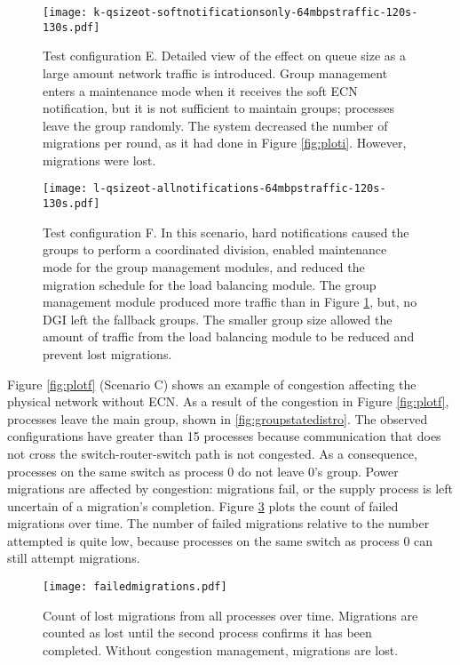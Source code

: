 \begin{figure}
\centering
\texttt{[image: k-qsizeot-softnotificationsonly-64mbpstraffic-120s-130s.pdf]}
\caption[Detailed view of the effect on queue size as a large amount network traffic is introduced.]{
    Test configuration E.
Detailed view of the effect on queue size as a large amount network traffic is introduced.
Group management enters a maintenance mode when it receives the soft \ac{ECN} notification, but it is not sufficient to maintain groups; processes leave the group randomly.
The system decreased the number of migrations per round, as it had done in Figure \ref{fig:ploti}.
However, migrations were lost.
}
\label{fig:plotk}
\centering
\end{figure}



\begin{figure}
\centering
\texttt{[image: l-qsizeot-allnotifications-64mbpstraffic-120s-130s.pdf]}
\caption[Effect on queue size as a large amount of network traffic is introduced.]
{
    Test configuration F.
In this scenario, hard notifications caused the groups to perform a coordinated division, enabled maintenance mode for the group management modules, and reduced the migration schedule for the load balancing module.
The group management module produced more traffic than in Figure \ref{fig:plotk}, but, no DGI left the fallback groups.
The smaller group size allowed the amount of traffic from the load balancing module to be reduced and prevent lost migrations.
}
\label{fig:plotl}
\end{figure}


Figure \ref{fig:plotf} (Scenario C) shows an example of congestion affecting the physical network without \ac{ECN}.
As a result of the congestion in Figure \ref{fig:plotf}, processes leave the main group, shown in \ref{fig:groupstatedistro}.
The observed configurations have greater than 15 processes because communication that does not cross the switch-router-switch path is not congested.
As a consequence, processes on the same switch as process 0 do not leave 0's group.
Power migrations are affected by congestion: migrations fail, or the supply process is left uncertain of a migration's completion.
Figure \ref{fig:plotg} plots the count of failed migrations over time.
The number of failed migrations relative to the number attempted is quite low, because processes on the same switch as process 0 can still attempt migrations.

\begin{figure}
\centering
\texttt{[image: failedmigrations.pdf]}
\caption[Count of lost migrations from all processes over time.]{Count of lost migrations from all processes over time. Migrations are counted as lost until the second process confirms it has been completed. Without congestion management, migrations are lost.}
\label{fig:plotg}
\end{figure}

